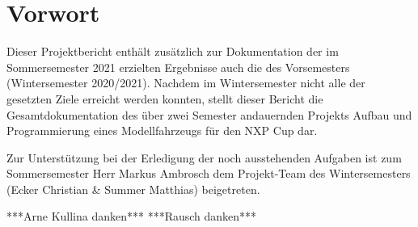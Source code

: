 

\pagestyle{fancy}
\rhead{\thepage} \chead{} 
\cfoot{}


\section*{Vorwort}\label{Sec0}

Dieser Projektbericht enthält zusätzlich zur Dokumentation der im Sommersemester 2021 erzielten Ergebnisse auch die des Vorsemesters (Wintersemester 2020/2021). Nachdem im Wintersemester nicht alle der gesetzten Ziele erreicht werden konnten, stellt dieser Bericht die Gesamtdokumentation des über zwei Semester andauernden Projekts \glqq{}Aufbau und Programmierung eines Modellfahrzeugs für den NXP Cup\grqq{} dar.\vspace{11pt} 

Zur Unterstützung bei der Erledigung der noch ausstehenden Aufgaben ist zum Sommersemester Herr Markus Ambrosch dem Projekt-Team des Wintersemesters (Ecker Christian \& Summer Matthias) beigetreten.\vspace{11pt} 

***Arne Kullina danken***\vspace{11pt} 
***Rausch danken***\vspace{11pt} 

\newpage